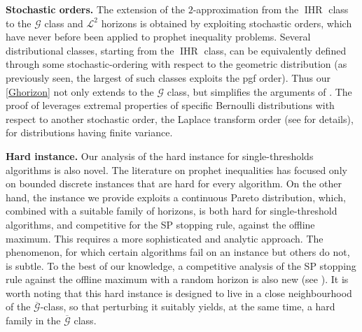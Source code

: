 \documentclass[11pt, a4paper, twoside]{article}
\newcommand{\PGF}{\mathcal{G}}
\newcommand{\PGFd}{\overline{\mathcal{G}}}
\DeclareMathOperator{\IHR}{IHR}
\numberwithin{equation}{section}
\begin{document}
	\textbf{Stochastic orders.} The extension of the $2$-approximation from the $\IHR$ class to the $\PGF$ class and $\mathcal{L}^2$ horizons is obtained by exploiting stochastic orders, which have never before been applied to prophet inequality problems. Several distributional classes, starting from the $\IHR$ class, can be equivalently defined through some stochastic-ordering with respect to the geometric distribution (as previously seen, the largest of such classes exploits the pgf order). Thus our \cref{Ghorizon} not only extends to the $\PGF$ class, but simplifies the arguments of \cite{AliBanGolMunWan20}. The proof of  leverages extremal properties of specific Bernoulli distributions with respect to another stochastic order, the Laplace transform order (see  for details), for distributions having finite variance.
	
	\textbf{Hard instance.} Our analysis of the hard instance for single-thresholds algorithms is also novel. The literature on prophet inequalities has focused only on bounded discrete instances that are hard for every algorithm. On the other hand, the instance we provide exploits a continuous Pareto distribution, which, combined with a suitable family of horizons, is both hard for single-threshold algorithms, and competitive for the SP stopping rule, against the offline maximum. This requires a more sophisticated and analytic approach. The phenomenon, for which certain algorithms fail on an instance but others do not, is subtle. To the best of our knowledge, a competitive analysis of the SP stopping rule against the offline maximum with a random horizon is also new (see ). It is worth noting that this hard instance is designed to live in a close neighbourhood of the $\PGFd$-class, so that perturbing it suitably yields, at the same time, a hard family in the $\PGFd$ class.
\end{document}

